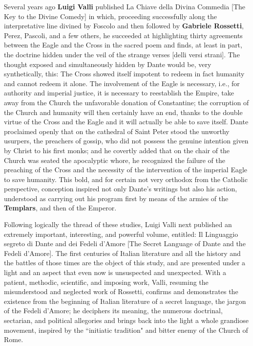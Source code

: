 Several years ago \textbf{Luigi Valli} published La Chiave della Divina Commedia [The Key to the Divine Comedy] in which, proceeding successfully along the interpretative line divined by Foscolo and then followed by \textbf{Gabriele Rossetti}, Perez, Pascoli, and a few others, he succeeded at highlighting thirty agreements between the Eagle and the Cross in the sacred poem and finds, at least in part, the doctrine hidden under the veil of the strange verses [delli versi strani]. The thought exposed and simultaneously hidden by Dante would be, very synthetically, this: The Cross showed itself impotent to redeem in fact humanity and cannot redeem it alone. The involvement of the Eagle is necessary, i.e., for authority and imperial justice, it is necessary to reestablish the Empire, take away from the Church the unfavorable donation of Constantine; the corruption of the Church and humanity will then certainly have an end, thanks to the double virtue of the Cross and the Eagle and it will actually be able to save itself. Dante proclaimed openly that on the cathedral of Saint Peter stood the unworthy usurpers, the preachers of gossip, who did not possess the genuine intention given by Christ to his first monks; and he covertly added that on the chair of the Church was seated the apocalyptic whore, he recognized the failure of the preaching of the Cross and the necessity of the intervention of the imperial Eagle to save humanity. This bold, and for certain not very orthodox from the Catholic perspective, conception inspired not only Dante's writings but also his action, understood as carrying out his program first by means of the armies of the \textbf{Templars}, and then of the Emperor.

Following logically the thread of these studies, Luigi Valli next published an extremely important, interesting, and powerful volume, entitled: Il Linguaggio segreto di Dante and dei Fedeli d'Amore [The Secret Language of Dante and the Fedeli d'Amore]. The first centuries of Italian literature and all the history and the battles of those times are the object of this study, and are presented under a light and an aspect that even now is unsuspected and unexpected. With a patient, methodic, scientific, and imposing work, Valli, resuming the misunderstood and neglected work of Rossetti, confirms and demonstrates the existence from the beginning of Italian literature of a secret language, the jargon of the Fedeli d'Amore; he deciphers its meaning, the numerous doctrinal, sectarian, and political allegories and brings back into the light a whole grandiose movement, inspired by the ``initiatic tradition" and bitter enemy of the Church of Rome.

